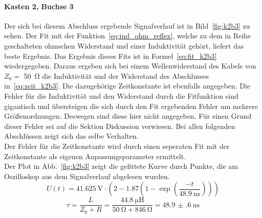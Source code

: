 \paragraph{Kasten 2, Buchse 3}
Der sich bei diesem Abschluss ergebende Signalverlauf ist in
Bild~\ref{fig:k2b3} zu sehen. Der Fit mit der
Funktion~\eqref{eq:ind_ohm_reflex}, welche zu dem in Reihe geschalteten
ohmschen Widerstand und einer Induktivität gehört, liefert das beste
Ergebnis. Das Ergebnis dieses Fits ist in Formel~\eqref{eq:fit_k2b3}
wiedergegeben.  Daraus ergeben sich bei einem Wellenwiderstand des 
Kabels von $Z_0 =$ \SI{50}{\ohm} die Induktivität und der Widerstand 
des Abschlusses in~\eqref{eq:zeit_k2b3}. Die dazugehörige 
Zeitkonstante ist ebenfalls angegeben. 
Die Fehler für die Induktivität und den Widerstand durch die 
Fitfunktion sind gigantisch und übersteigen die sich durch den Fit 
ergebenden Fehler um mehrere Größenordnungen. 
Deswegen sind diese 
hier nicht angegeben. Für einen Grund dieser Fehler sei auf 
die Sektion Diskussion verwiesen. Bei allen folgenden Abschlüssen 
zeigt sich das selbe Verhalten.\\
Der Fehler für die Zeitkonstante wird durch einen seperaten Fit mit 
der Zeitkonstante als eigenen Anpassungsparameter ermittelt.\\
Der Plot in Abb.~\ref{fig:k2b3} zeigt die gefittete Kurve durch Punkte, die am
Oszilloskop aus dem Signalverlauf abgelesen wurden.
%
\begin{equation}
  U(t) = \SI{41.625}{\volt}\cdot\left(2 - 
    1.87\left(1-\exp{\left(\frac{-t}{\SI{48.9}{\nano\second}}\right)}
    \right)\right)
  \label{eq:fit_k2b3}
\end{equation}
%
\begin{equation}
  \tau = \frac{L}{Z_0 + R} = \frac{\SI{44.8}{\micro\henry}}
{\SI{50}{\ohm} + \SI{846}{\ohm}} 
=\SI{48.9(6)}{\nano\second}
  \label{eq:zeit_k2b3}
\end{equation}
%
